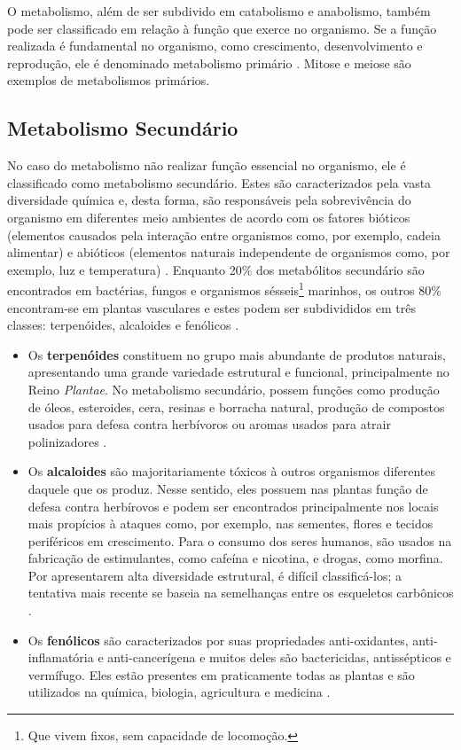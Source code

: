 \indent O metabolismo, além de ser subdivido em catabolismo e anabolismo, também pode ser classificado em relação à função que exerce no organismo. Se a função realizada é fundamental no organismo, como crescimento, desenvolvimento e reprodução, ele é denominado metabolismo primário \cite{Cap3schomburg}. Mitose e meiose são exemplos de metabolismos primários.  

\subsection{Metabolismo Secundário}

\indent No caso do metabolismo não realizar função essencial no organismo, ele é classificado como metabolismo secundário. Estes são caracterizados pela vasta diversidade química e, desta forma, são responsáveis pela sobrevivência do organismo em diferentes meio ambientes de acordo com os fatores bióticos (elementos causados pela interação entre organismos como, por exemplo, cadeia alimentar) e abióticos (elementos naturais independente de organismos como, por exemplo, luz e temperatura) \cite{Cap3schomburg}. Enquanto 20\% dos metabólitos secundário são encontrados em bactérias, fungos e organismos sésseis\footnote{Que vivem fixos, sem capacidade de locomoção.} marinhos, os outros 80\% encontram-se em plantas vasculares \cite{Cap3schomburg} e estes podem ser subdivididos em três classes: terpenóides, alcaloides e fenólicos \cite{kabera14}.
\begin{itemize}
\item Os \textbf{terpenóides} constituem no grupo mais abundante de produtos naturais, apresentando uma grande variedade estrutural e funcional, principalmente no Reino \textit{Plantae}. No metabolismo secundário, possem funções como produção de óleos, esteroides, cera, resinas e borracha natural, produção de compostos usados para defesa contra herbívoros ou aromas usados para atrair polinizadores \cite{Cap3schomburg}.

\item Os \textbf{alcaloides} são majoritariamente tóxicos à outros organismos diferentes daquele que os produz. Nesse sentido, eles possuem nas plantas função de defesa contra herbírovos e podem ser encontrados principalmente nos locais mais propícios à ataques como, por exemplo, nas sementes, flores e tecidos periféricos em crescimento. Para o consumo dos seres humanos, são usados na fabricação de estimulantes, como cafeína e nicotina, e drogas, como morfina\cite{Cap3schomburg}. Por apresentarem alta diversidade estrutural, é difícil classificá-los; a tentativa mais recente se baseia na semelhanças entre os esqueletos carbônicos \cite{kabera14}.

\item Os \textbf{fenólicos} são caracterizados por suas propriedades anti-oxidantes, anti-inflamatória e anti-cancerígena e muitos deles são bactericidas, antissépticos e vermífugo. Eles estão presentes em praticamente todas as plantas e são utilizados na química, biologia, agricultura e medicina \cite{kabera14}.
\end{itemize}


